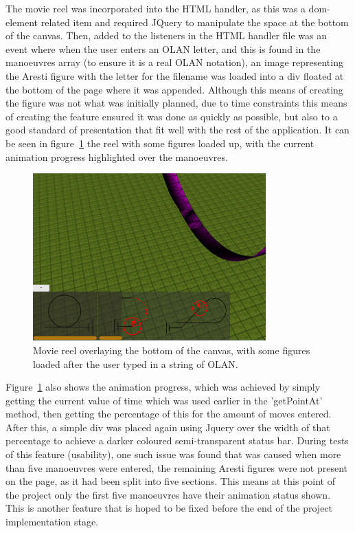 The movie reel was incorporated into the HTML handler, as this was a dom-element related item and required JQuery to manipulate the space at the bottom of the canvas. Then, added to the listeners in the HTML handler file was an event where when the user enters an OLAN letter, and this is found in the manoeuvres array (to ensure it is a real OLAN notation), an image representing the Aresti figure with the letter for the filename was loaded into a div floated at the bottom of the page where it was appended. Although this means of creating the figure was not what was initially planned, due to time constraints this means of creating the feature ensured it was done as quickly as possible, but also to a good standard of presentation that fit well with the rest of the application. It can be seen in figure~\ref{fig:movie} the reel with some figures loaded up, with the current animation progress highlighted over the manoeuvres.

\clearpage 

\begin{figure}[h]
  \centering
      \includegraphics[width=0.8\textwidth]{images/movie.png}
  \caption{Movie reel overlaying the bottom of the canvas, with some figures loaded after the user typed in a string of OLAN.}
  \label{fig:movie}
\end{figure}

Figure~\ref{fig:movie} also shows the animation progress, which was achieved by simply getting the current value of time which was used earlier in the 'getPointAt' method, then getting the percentage of this for the amount of moves entered. After this, a simple div was placed again using Jquery over the width of that percentage to achieve a darker coloured semi-transparent status bar. During tests of this feature (usability), one such issue was found that was caused when more than five manoeuvres were entered, the remaining Aresti figures were not present on the page, as it had been split into five sections. This means at this point of the project only the first five manoeuvres have their animation status shown. This is another feature that is hoped to be fixed before the end of the project implementation stage. 

